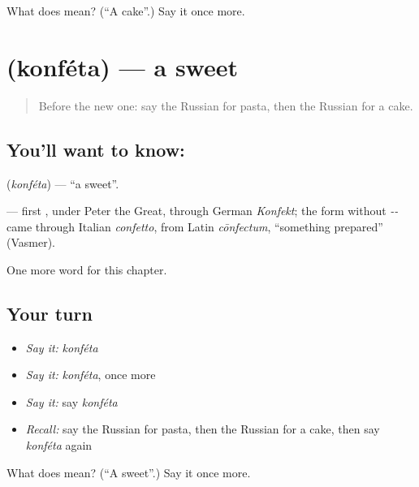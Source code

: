 \begin{tcolorbox}[breakable,colback=teal!4,colframe=teal!35!black,title={Before you move on}]
What does  mean? (\textquotedblleft{}A cake\textquotedblright{}.) Say it once more.
\end{tcolorbox}
\section[\texorpdfstring{\ru{конфета} (konféta)}{конфета (konféta)}]{ (konféta) — a sweet}

\label{lesson:RU-C250-konfeta}



\begin{quote}
Before the new one: say the Russian for pasta, then the Russian for a cake.
\end{quote}

\subsection*{You'll want to know: }
\textbf{} (\emph{konféta}) — \textquotedblleft{}a sweet\textquotedblright{}.

\begin{cousinweb}
\textbf{} — first \emph{}, under Peter the Great, through German \emph{Konfekt}; the form without \emph{--} came through Italian \emph{confetto}, from Latin \emph{cōnfectum}, \textquotedblleft{}something prepared\textquotedblright{} (Vasmer).
\end{cousinweb}

\begin{grammarlens}[title={What you've built}]
One more word for this chapter.
\end{grammarlens}

\subsection*{Your turn}
\begin{itemize}
\raggedright
  \item \emph{Say it:} \emph{konféta}
  \item \emph{Say it:} \emph{konféta}, once more
  \item \emph{Say it:} say \emph{konféta}
  \item \emph{Recall:} say the Russian for pasta, then the Russian for a cake, then say \emph{konféta} again
\end{itemize}

\begin{tcolorbox}[breakable,colback=teal!4,colframe=teal!35!black,title={Before you move on}]
What does  mean? (\textquotedblleft{}A sweet\textquotedblright{}.) Say it once more.
\end{tcolorbox}
